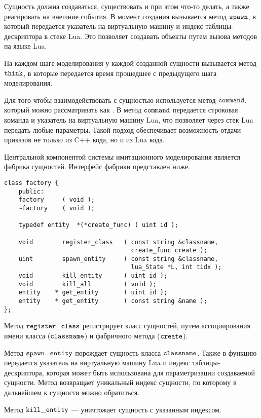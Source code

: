 Сущность должна создаваться, существовать и при этом что-то делать, а также реагировать на внешние события.
В момент создания вызывается метод $\tt spawn$, в который передается указатель на виртуальную машину и индекс таблицы-дескриптора в стеке Lua. Это позволяет создавать объекты путем вызова методов на языке Lua.

На каждом шаге моделирования у каждой созданной сущности вызывается метод $\tt think$, в которые передается время прошедшее с предыдущего шага моделирования.

Для того чтобы взаимодействовать с сущностью используется метод $\tt command$, который можно рассматривать как . В метод $\tt command$ передается строковая команда и указатель на виртуальную машину Lua, что позволяет через стек Lua передать любые параметры. Такой подход обеспечивает возможность отдачи приказов не только из C++ кода, но и из Lua кода.


Центральной компонентой системы имитационного моделирования является фабрика сущностей.
Интерфейс фабрики представлен ниже.

\begin{lstlisting}[caption={Интерфейс фабрики сущностей}]
class factory {
    public:
    factory     ( void );
    ~factory    ( void );

    typedef	entity	*(*create_func)	( uint id );

    void        register_class   ( const string &classname, 
                                   create_func create );
    uint        spawn_entity     ( const string &classname, 
                                   lua_State *L, int tidx );
    void        kill_entity      ( uint id );
    void        kill_all         ( void );
    entity    * get_entity       ( uint id );
    entity    * get_entity       ( const string &name );
};
\end{lstlisting}

Метод $\tt register\_class$ регистрирует класс сущностей, путем ассоциирования имени класса ($\tt classname$) и фабричного метода ($\tt create$).

Метод $\tt spawn\_entity$ порождает сущность класса $\tt classname$. 
Также в функцию передается указатель на виртуальную машину Lua и индекс таблицы-дескриптора, которая может быть использована для параметризации создаваемой сущности.
Метод возвращает уникальный индекс сущности, по которому в дальнейшем к сущности можно обратиться.

Метод $\tt kill\_entity$ --- уничтожает сущность с указанным индексом.

